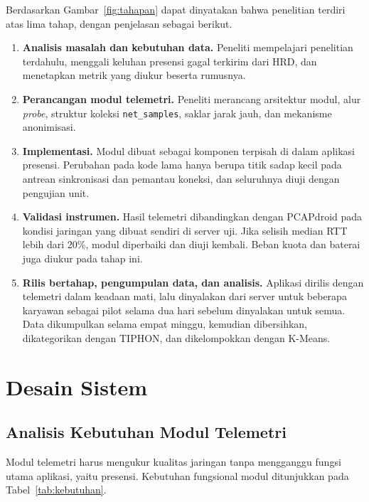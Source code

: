 Berdasarkan Gambar~\ref{fig:tahapan} dapat dinyatakan bahwa penelitian terdiri atas lima tahap, dengan penjelasan sebagai berikut.
\begin{enumerate}
    \item \textbf{Analisis masalah dan kebutuhan data.} Peneliti mempelajari penelitian terdahulu, menggali keluhan presensi gagal terkirim dari HRD, dan menetapkan metrik yang diukur beserta rumusnya.
    \item \textbf{Perancangan modul telemetri.} Peneliti merancang arsitektur modul, alur \textit{probe}, struktur koleksi \texttt{net\_samples}, saklar jarak jauh, dan mekanisme anonimisasi.
    \item \textbf{Implementasi.} Modul dibuat sebagai komponen terpisah di dalam aplikasi presensi. Perubahan pada kode lama hanya berupa titik sadap kecil pada antrean sinkronisasi dan pemantau koneksi, dan seluruhnya diuji dengan pengujian unit.
    \item \textbf{Validasi instrumen.} Hasil telemetri dibandingkan dengan PCAPdroid pada kondisi jaringan yang dibuat sendiri di server uji. Jika selisih median RTT lebih dari 20\%, modul diperbaiki dan diuji kembali. Beban kuota dan baterai juga diukur pada tahap ini.
    \item \textbf{Rilis bertahap, pengumpulan data, dan analisis.} Aplikasi dirilis dengan telemetri dalam keadaan mati, lalu dinyalakan dari server untuk beberapa karyawan sebagai pilot selama dua hari sebelum dinyalakan untuk semua. Data dikumpulkan selama empat minggu, kemudian dibersihkan, dikategorikan dengan TIPHON, dan dikelompokkan dengan K-Means.
\end{enumerate}

\section{Desain Sistem}

\subsection{Analisis Kebutuhan Modul Telemetri}
Modul telemetri harus mengukur kualitas jaringan tanpa mengganggu fungsi utama aplikasi, yaitu presensi. Kebutuhan fungsional modul ditunjukkan pada Tabel~\ref{tab:kebutuhan}.

